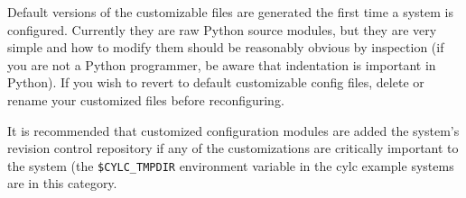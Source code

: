 Default versions of the customizable files are generated the first time
a system is configured. Currently they are raw Python source modules,
but they are very simple and how to modify them should be reasonably
obvious by inspection (if you are not a Python programmer, be aware that
indentation is important in Python).  If you wish to revert to default
customizable config files, delete or rename your customized files before
reconfiguring.

It is recommended that customized configuration modules are added the
system's revision control repository if any of the customizations are
critically important to the system (the \lstinline=$CYLC_TMPDIR=
environment variable in the cylc example systems are in this category.


